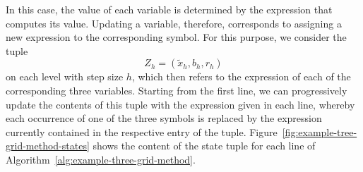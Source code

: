 In this case, the value of each variable is determined by the expression that computes its value.
Updating a variable, therefore, corresponds to assigning a new expression to the corresponding symbol.
For this purpose, we consider the tuple
\begin{equation*}
	Z_h = (\tilde{x}_h, b_h, r_h)
\end{equation*} 
on each level with step size $h$, which then refers to the expression of each of the corresponding three variables.
Starting from the first line, we can progressively update the contents of this tuple with the expression given in each line, whereby each occurrence of one of the three symbols is replaced by the expression currently contained in the respective entry of the tuple.
Figure~\ref{fig:example-tree-grid-method-states} shows the content of the state tuple for each line of Algorithm~\ref{alg:example-three-grid-method}.
